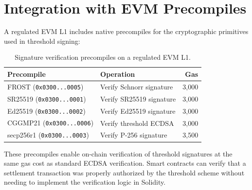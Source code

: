 \section{Integration with EVM Precompiles}

\label{sec:precompiles}

A regulated EVM L1 includes native precompiles for the cryptographic
primitives used in threshold signing:

\begin{table}[h]
\centering
\begin{tabular}{llr}
\toprule
\textbf{Precompile} & \textbf{Operation} & \textbf{Gas} \\
\midrule
FROST (\texttt{0x0300...0005}) & Verify Schnorr signature & 3,000 \\
SR25519 (\texttt{0x0300...0001}) & Verify SR25519 signature & 3,000 \\
Ed25519 (\texttt{0x0300...0002}) & Verify Ed25519 signature & 3,000 \\
CGGMP21 (\texttt{0x0300...0006}) & Verify threshold ECDSA & 3,000 \\
secp256r1 (\texttt{0x0300...0003}) & Verify P-256 signature & 3,500 \\
\bottomrule
\end{tabular}
\caption{Signature verification precompiles on a regulated EVM L1.}
\label{tab:precompiles}
\end{table}

These precompiles enable on-chain verification of threshold signatures
at the same gas cost as standard ECDSA verification.  Smart contracts
can verify that a settlement transaction was properly authorized by
the threshold scheme without needing to implement the verification
logic in Solidity.

